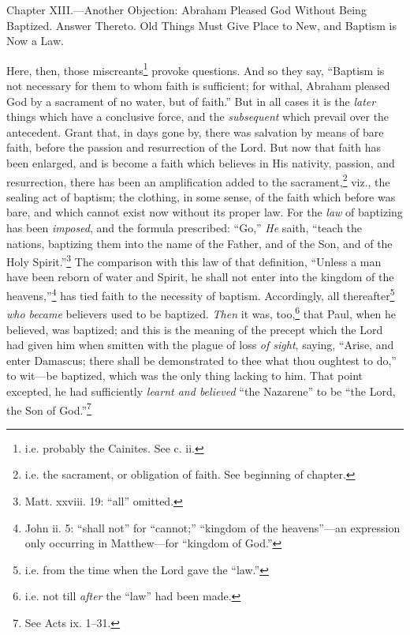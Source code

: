 
Chapter XIII.—Another Objection: Abraham Pleased God Without Being Baptized. Answer Thereto. Old Things Must Give Place to New, and Baptism is Now a Law.

Here, then, those miscreants\footnote{i.e. probably the Cainites. See c. ii.} provoke questions. And so they say, “Baptism is not necessary for them to whom faith is sufficient; for withal, Abraham pleased God by a sacrament of no water, but of faith.” But in all cases it is the \emph{later} things which have a conclusive force, and the \emph{subsequent} which prevail over the antecedent. Grant that, in days gone by, there was salvation by means of bare faith, before the passion and resurrection of the Lord. But now that faith has been enlarged, and is become a faith which believes in His nativity, passion, and resurrection, there has been an amplification added to the sacrament,\footnote{i.e. the sacrament, or obligation of faith. See beginning of chapter.} viz., the sealing act of baptism; the clothing, in some sense, of the faith which before was bare, and which cannot exist now without its proper law. For the \emph{law} of baptizing has been \emph{imposed}, and the formula prescribed: “Go,” \emph{He} saith, “teach the nations, baptizing them into the name of the Father, and of the Son, and of the Holy Spirit.”\footnote{Matt. xxviii. 19: “all” omitted.} The comparison with this law of that definition, “Unless a man have been reborn of water and Spirit, he shall not enter into the kingdom of the heavens,”\footnote{John ii. 5: “shall not” for “cannot;” “kingdom of the heavens”—an expression only occurring in Matthew—for “kingdom of God.”} has tied faith to the necessity of baptism. Accordingly, all thereafter\footnote{i.e. from the time when the Lord gave the “law.”} \emph{who became} believers used to be baptized. \emph{Then} it was, too,\footnote{i.e. not till \emph{after} the “law” had been made.} that Paul, when he believed, was baptized; and this is the meaning of the precept which the Lord had given him when smitten with the plague of loss \emph{of sight}, saying, “Arise, and enter Damascus; there shall be demonstrated to thee what thou oughtest to do,” to wit—be baptized, which was the only thing lacking to him. That point excepted, he had sufficiently \emph{learnt and believed} “the Nazarene” to be “the Lord, the Son of God.”\footnote{See Acts ix. 1–31.}

